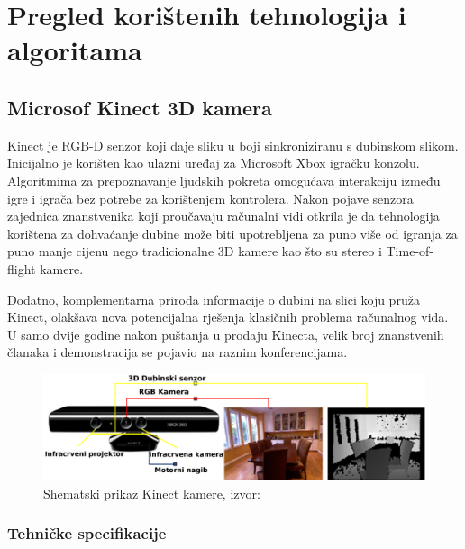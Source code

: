 \newpage
\setcounter{figure}{0}

\section{Pregled korištenih tehnologija i algoritama} %
\label{sec:Tehnologija i teorija}

\subsection{Microsof Kinect 3D kamera} %
\label{sub:Microsof Kinect 3D kamera}

Kinect je RGB-D senzor koji daje sliku u boji sinkroniziranu s dubinskom
slikom. Inicijalno je korišten kao ulazni uređaj za Microsoft Xbox
igračku konzolu. Algoritmima za prepoznavanje ljudskih pokreta omogućava
interakciju između igre i igrača bez potrebe za korištenjem kontrolera.
Nakon pojave senzora zajednica znanstvenika koji proučavaju računalni
vidi otkrila je da tehnologija korištena za dohvaćanje dubine može biti
upotrebljena za puno više od igranja za puno manje cijenu nego
tradicionalne 3D kamere kao što su stereo i Time-of-flight kamere.

Dodatno, komplementarna priroda informacije o dubini na slici koju pruža
Kinect, olakšava nova potencijalna rješenja klasičnih problema računalnog
vida. U samo dvije godine nakon puštanja u prodaju Kinecta, velik broj
znanstvenih članaka i demonstracija se pojavio na raznim konferencijama.

\begin{figure}[h]
\centering
\includegraphics[scale=0.15]{figures/kinect.png}
\caption{Shematski prikaz Kinect kamere, izvor:~\cite{HanSXS13}}
\label{fig:kinect.png}
\end{figure}

\subsubsection{Tehničke specifikacije} %
\label{ssub:Tehničke specifikacije}

